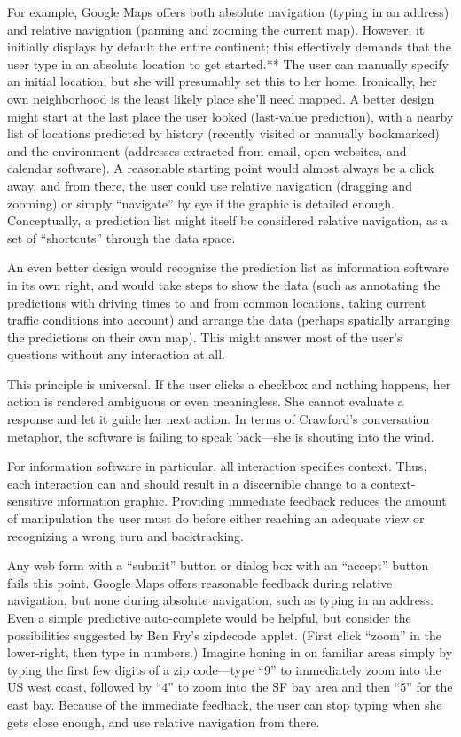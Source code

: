 {For example, Google Maps offers both absolute navigation (typing in an address) and relative navigation (panning and zooming the current map). However, it initially displays by default the entire continent; this effectively demands that the user type in an absolute location to get started.** The user can manually specify an initial location, but she will presumably set this to her home. Ironically, her own neighborhood is the least likely place she’ll need mapped. A better design might start at the last place the user looked (last-value prediction), with a nearby list of locations predicted by history (recently visited or manually bookmarked) and the environment (addresses extracted from email, open websites, and calendar software). A reasonable starting point would almost always be a click away, and from there, the user could use relative navigation (dragging and zooming) or simply “navigate” by eye if the graphic is detailed enough. Conceptually, a prediction list might itself be considered relative navigation, as a set of “shortcuts” through the data space.


An even better design would recognize the prediction list as information software in its own right, and would take steps to show the data (such as annotating the predictions with driving times to and from common locations, taking current traffic conditions into account) and arrange the data (perhaps spatially arranging the predictions on their own map). This might answer most of the user’s questions without any interaction at all.

This principle is universal. If the user clicks a checkbox and nothing happens, her action is rendered ambiguous or even meaningless. She cannot evaluate a response and let it guide her next action. In terms of Crawford’s conversation metaphor, the software is failing to speak back—she is shouting into the wind.


For information software in particular, all interaction specifies context. Thus, each interaction can and should result in a discernible change to a context-sensitive information graphic. Providing immediate feedback reduces the amount of manipulation the user must do before either reaching an adequate view or recognizing a wrong turn and backtracking.


Any web form with a “submit” button or dialog box with an “accept” button fails this point. Google Maps offers reasonable feedback during relative navigation, but none during absolute navigation, such as typing in an address. Even a simple predictive auto-complete would be helpful, but consider the possibilities suggested by Ben Fry’s zipdecode applet. (First click “zoom” in the lower-right, then type in numbers.) Imagine honing in on familiar areas simply by typing the first few digits of a zip code—type “9” to immediately zoom into the US west coast, followed by “4” to zoom into the SF bay area and then “5” for the east bay. Because of the immediate feedback, the user can stop typing when she gets close enough, and use relative navigation from there.

}
